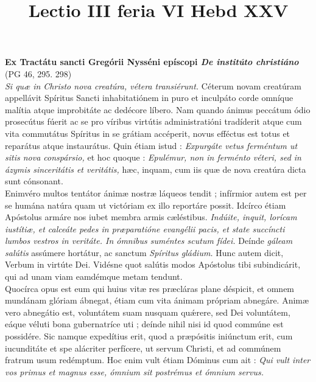 \documentclass[options]{article}
\title{Lectio III feria VI Hebd XXV}
\begin{document}
	\textbf{Ex Tractátu sancti Gregórii Nysséni epíscopi
		\textit{De institúto christiáno}}\\
	(PG 46, 295. 298)\\
	
	\textit{Si quæ in Christo nova creatúra, vétera transiérunt.}
	Céterum novam creatúram appellávit Spíritus Sancti inhabitatiónem in puro et inculpáto corde omníque malítia atque improbitáte ac dedécore líbero. Nam quando ánimus peccátum ódio prosecútus fúerit ac se pro víribus virtútis administratióni tradíderit atque cum vita commutátus Spíritus in se grátiam accéperit, novus efféctus est totus et reparátus atque instaurátus. Quin étiam istud : 
	\textit{Expurgáte vetus ferméntum ut sitis nova conspársio,}
	et hoc quoque :
	 \textit{Epulémur, non in ferménto véteri, sed in ázymis sinceritátis et veritátis,}
	 hæc, inquam, cum iis quæ de nova creatúra dicta sunt cónsonant.\\
	 
	 Enimvéro multos tentátor ánimæ nostræ láqueos tendit ; infírmior autem est per se humána natúra quam ut victóriam ex illo reportáre possit. Idcírco étiam Apóstolus armáre nos iubet membra armis cæléstibus.
	 \textit{Indúite, inquit, lorícam iustítiæ, et calceáte pedes in præparatióne evangélii pacis, et state succíncti lumbos vestros in veritáte. In ómnibus suméntes scutum fídei.}
	 Deínde
	  \textit{gáleam salútis}
	  assúmere hortátur, ac sanctum 
	  \textit{Spíritus gládium.}
	  Hunc autem dicit, Verbum in virtúte Dei. Vidésne quot salútis modos Apóstolus tibi subindicárit, qui ad unam viam eamdémque metam tendunt.\\
	  
	  Quocírca opus est eum qui huius vitæ res præcláras plane déspicit, et omnem mundánam glóriam ábnegat, étiam cum vita ánimam própriam abnegáre. Animæ vero abnegátio est, voluntátem suam nusquam qu\'{æ}rere, sed Dei voluntátem, eáque véluti bona gubernatríce uti ; deínde nihil nisi id quod commúne est possidére. Sic namque expedítius erit, quod a præpósitis iniúnctum erit, cum iucunditáte et spe alácriter perfícere, ut servum Christi, et ad commúnem fratrum usum redémptum. Hoc enim vult étiam Dóminus cum ait : 
	  \textit{Qui vult inter vos primus et magnus esse, ómnium sit postrémus et ómnium servus.}
	 
	
	
	
\end{document}
